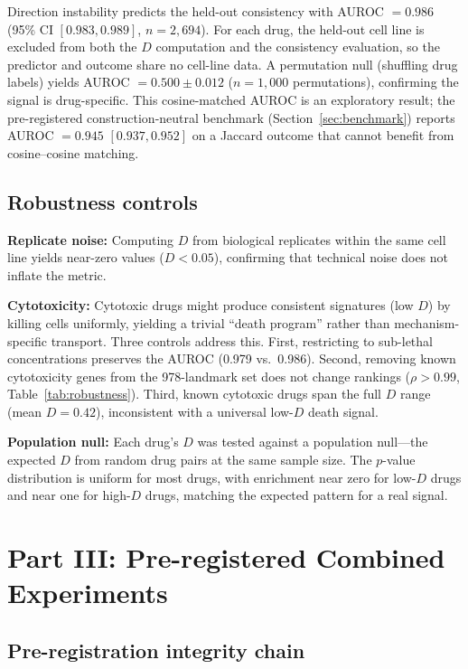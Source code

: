 \documentclass[11pt]{article}
\begin{document}
Direction instability predicts the held-out consistency with AUROC $=
0.986$ (95\% CI $[0.983, 0.989]$, $n = 2{,}694$). For each drug, the
held-out cell line is excluded from both the $D$ computation and the
consistency evaluation, so the predictor and outcome share no cell-line
data. A permutation null (shuffling drug labels) yields AUROC $= 0.500
\pm 0.012$ ($n = 1{,}000$ permutations), confirming the signal is
drug-specific. This cosine-matched AUROC is an exploratory result;
the pre-registered construction-neutral benchmark
(Section~\ref{sec:benchmark}) reports AUROC $= 0.945$ $[0.937, 0.952]$
on a Jaccard outcome that cannot benefit from cosine--cosine matching.

\subsection{Robustness controls}

\textbf{Replicate noise:} Computing $D$ from biological replicates
within the same cell line yields near-zero values ($D < 0.05$),
confirming that technical noise does not inflate the metric.

\textbf{Cytotoxicity:} Cytotoxic drugs might produce consistent
signatures (low $D$) by killing cells uniformly, yielding a trivial
``death program'' rather than mechanism-specific transport. Three
controls address this. First, restricting to sub-lethal concentrations
preserves the AUROC (0.979 vs.\ 0.986). Second, removing known
cytotoxicity genes from the 978-landmark set does not change rankings
($\rho > 0.99$, Table~\ref{tab:robustness}). Third, known cytotoxic
drugs span the full $D$ range (mean $D = 0.42$), inconsistent with a
universal low-$D$ death signal.

\textbf{Population null:} Each drug's $D$ was tested against a
population null---the expected $D$ from random drug pairs at the same
sample size. The $p$-value distribution is uniform for most drugs, with
enrichment near zero for low-$D$ drugs and near one for high-$D$ drugs,
matching the expected pattern for a real signal.


\section{Part III: Pre-registered Combined Experiments}

\subsection{Pre-registration integrity chain}
\end{document}
